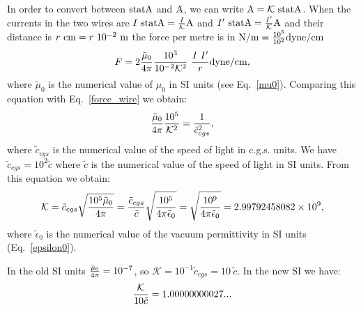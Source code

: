 \documentclass[12pt,a4paper,twoside]{report}
\def\kappaa{1.000000000274\times 10^{-1}}
\def\kappa{2.99792458082\times 10^{9}}
\def\kappadiecic{1.00000000027}
\begin{document}
{{In order to convert between ${\rm statA}$ and ${\rm A}$, we can write 
${\rm A}= \mathcal{K}\ {\rm statA}$. 
When the currents in the two wires are $I\ {\rm statA}={I\over \mathcal{K}} {\rm A}$ and 
$I'\ {\rm statA}={I'\over \mathcal{K}} {\rm A}$ and their distance
is $r\ {\rm cm}=r\ 10^{-2}\ {\rm m}$ the force per metre is in 
${\rm N}/{\rm m}=
{10^5\over 10^2} {\rm dyne}/{\rm cm}$
\begin{equation}
F=2{\tilde \mu_0\over 4\pi} {10^3\over 10^{-2} \mathcal{K}^2}\ {I\ I' \over r} {\rm dyne/cm},
\end{equation}
where $\tilde \mu_0$ is the numerical value of $\mu_0$ in SI units
(see Eq.~\ref{mu0}). Comparing this equation with Eq.~\ref{force_wire} we
obtain:
\begin{equation}
{\tilde \mu_0 \over 4 \pi} {10^5\over \mathcal{K}^2} = 
{1\over \tilde c_{cgs}^2}, 
\end{equation}
where $\tilde c_{cgs}$ is the numerical value of the speed of light in
c.g.s. units. We have $\tilde c_{cgs}=10^2 \tilde c$ where $\tilde c$ is
the numerical value of the speed of light in SI units. From this
equation we obtain:
\begin{equation}
\mathcal{K} = \tilde c_{cgs} \sqrt {10^5 \tilde \mu_0 \over 4 \pi} =
{\tilde c_{cgs}\over \tilde c} 
\sqrt {10^5 \over 4 \pi \tilde \epsilon_0}=\sqrt {10^9 \over 4 \pi 
\tilde \epsilon_0}=\kappa,
\end{equation}
where $\tilde \epsilon_0$ is the numerical value of the vacuum permittivity
in SI units (Eq.~\ref{epsilon0}).

In the old SI units ${\tilde \mu_0 \over 4 \pi} = 10^{-7}$, so 
$\mathcal{K}=10^{-1} \tilde c_{cgs}= 10\ \tilde c$.
In the new SI we have:
\begin{equation}
{\mathcal{K}\over 10 \tilde c}= \kappadiecic...
\end{equation}
\\
}

%

}
\end{document}
